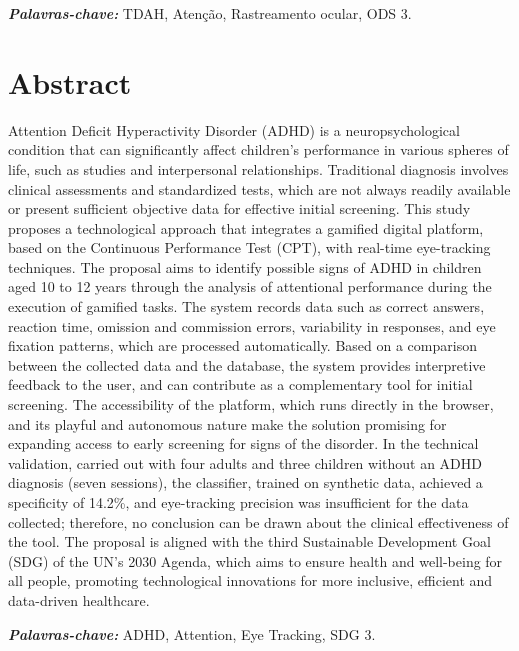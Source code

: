 \documentclass[11pt,a4paper]{article}
\begin{document}
\vspace{0.3cm}
\noindent\textit{\textbf{Palavras-chave:}} TDAH, Atenção, Rastreamento ocular, ODS 3.

\vspace{0.5cm}


\section*{Abstract}

Attention Deficit Hyperactivity Disorder (ADHD) is a neuropsychological condition that can significantly affect children's performance in various spheres of life, such as studies and interpersonal relationships. Traditional diagnosis involves clinical assessments and standardized tests, which are not always readily available or present sufficient objective data for effective initial screening. This study proposes a technological approach that integrates a gamified digital platform, based on the Continuous Performance Test (CPT), with real-time eye-tracking techniques. The proposal aims to identify possible signs of ADHD in children aged 10 to 12 years through the analysis of attentional performance during the execution of gamified tasks. The system records data such as correct answers, reaction time, omission and commission errors, variability in responses, and eye fixation patterns, which are processed automatically. Based on a comparison between the collected data and the database, the system provides interpretive feedback to the user, and can contribute as a complementary tool for initial screening. The accessibility of the platform, which runs directly in the browser, and its playful and autonomous nature make the solution promising for expanding access to early screening for signs of the disorder. In the technical validation, carried out with four adults and three children without an ADHD diagnosis (seven sessions), the classifier, trained on synthetic data, achieved a specificity of 14.2\%, and eye-tracking precision was insufficient for the data collected; therefore, no conclusion can be drawn about the clinical effectiveness of the tool. The proposal is aligned with the third Sustainable Development Goal (SDG) of the UN's 2030 Agenda, which aims to ensure health and well-being for all people, promoting technological innovations for more inclusive, efficient and data-driven healthcare.

\vspace{0.3cm}
\noindent\textit{\textbf{Palavras-chave:}} ADHD, Attention, Eye Tracking, SDG 3.
\end{document}
